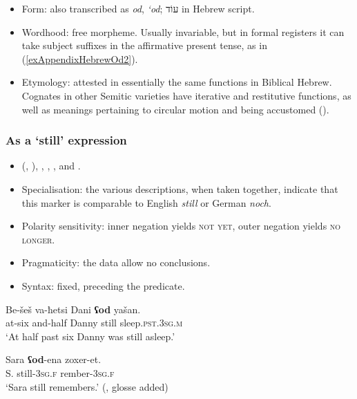 \begin{itemize}
	\item Form: also transcribed as \textit{od}, \textit{\lq{}\textit{od}}; עוֹד in Hebrew script.
	\item Wordhood: free morpheme. Usually invariable, but in formal registers it can take subject suffixes in the affirmative present tense, as in (\ref{exAppendixHebrewOd2}).
	\item Etymology: attested in essentially the same functions in Biblical Hebrew. Cognates in other Semitic varieties have iterative and restitutive functions, as well as meanings pertaining to circular motion and being accustomed (\cite[s.v. ]{BrownEtAl}).
\end{itemize}


\subsubsection{As a \lq{}still\rq{ }expression}

\begin{itemize}
	\sloppy
	\item \citeauthor{Glinert1976} (\citeyear{Glinert1976}, \citeyear[239, 532]{Glinert1989}), \textcite{Greenberg2012}, \textcite[45]{Schwarzwald2001}, \textcite{Thomas2018}, \textcite{Tobin1985} and \textcite{TsirkinSadan2019}.
	\item Specialisation: the various descriptions, when taken together, indicate that this marker is comparable to English \textit{still} or German \textit{noch}.
	\item Polarity sensitivity: inner negation yields \textsc{not yet}, outer negation yields \textsc{no longer}.
	\item Pragmaticity: the data allow no conclusions.
	\item Syntax: fixed, preceding the predicate.
\end{itemize}

\begin{exe}
	\ex
	\gll Be-šeš va-ħetsi Dani \textbf{ʕod} yašan.\\
	at-six and-half Danny still sleep.\textsc{pst}.3\textsc{sg}.\textsc{m}\\
	\glt \lq At half past six Danny was still asleep.' \parencite[151]{Greenberg2012}
	
	\ex\label{exAppendixHebrewOd2}
	\gll Sara \textbf{ʕod}-ena zoxer-et.\\
	S. still-3\textsc{sg}.\textsc{f} rember-3\textsc{sg}.\textsc{f}\\
	\glt \lq Sara still remembers.\rq{ }(\cite[532]{Glinert1989}, glosse added)
\end{exe}

